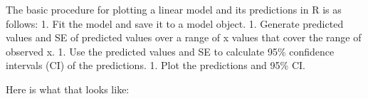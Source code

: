 \documentclass[
  13,
  letterpaper,
]{report}
\newenvironment{Shaded}{\begin{snugshade}}{\end{snugshade}}
\newcommand{\AttributeTok}[1]{\textcolor[rgb]{0.40,0.45,0.13}{#1}}
\newcommand{\CommentTok}[1]{\textcolor[rgb]{0.37,0.37,0.37}{#1}}
\newcommand{\ConstantTok}[1]{\textcolor[rgb]{0.56,0.35,0.01}{#1}}
\newcommand{\DecValTok}[1]{\textcolor[rgb]{0.68,0.00,0.00}{#1}}
\newcommand{\FunctionTok}[1]{\textcolor[rgb]{0.28,0.35,0.67}{#1}}
\newcommand{\NormalTok}[1]{\textcolor[rgb]{0.00,0.23,0.31}{#1}}
\newcommand{\OtherTok}[1]{\textcolor[rgb]{0.00,0.23,0.31}{#1}}
\newcommand{\SpecialCharTok}[1]{\textcolor[rgb]{0.37,0.37,0.37}{#1}}
\newcommand{\StringTok}[1]{\textcolor[rgb]{0.13,0.47,0.30}{#1}}
\begin{document}
The basic procedure for plotting a linear model and its predictions in R
is as follows: 1. Fit the model and save it to a model object. 1.
Generate predicted values and SE of predicted values over a range of x
values that cover the range of observed x. 1. Use the predicted values
and SE to calculate 95\% confidence intervals (CI) of the predictions.
1. Plot the predictions and 95\% CI.

Here is what that looks like:

\begin{Shaded}
\end{Shaded}
\end{document}
